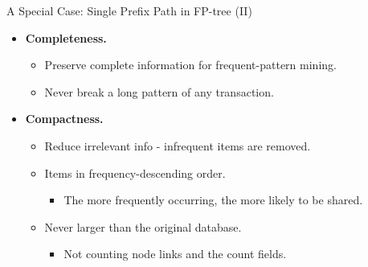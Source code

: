 \begin{frame}{A Special Case: Single Prefix Path in FP-tree (II)}
	\centering
	\begin{itemize}
		\item \textbf{Completeness.}
		      \begin{itemize}
			      \item Preserve complete information for frequent-pattern mining.
			      \item Never break a long pattern of any transaction.
		      \end{itemize}
		\item \textbf{Compactness.}
		      \begin{itemize}
			      \item Reduce irrelevant info - infrequent items are removed.
			      \item Items in frequency-descending order.
			            \begin{itemize}
				            \item The more frequently occurring, the more likely to be
				                  shared.
			            \end{itemize}
			      \item Never larger than the original database.
			            \begin{itemize}
				            \item Not counting node links and the count fields.
			            \end{itemize}
		      \end{itemize}
	\end{itemize}
\end{frame}

